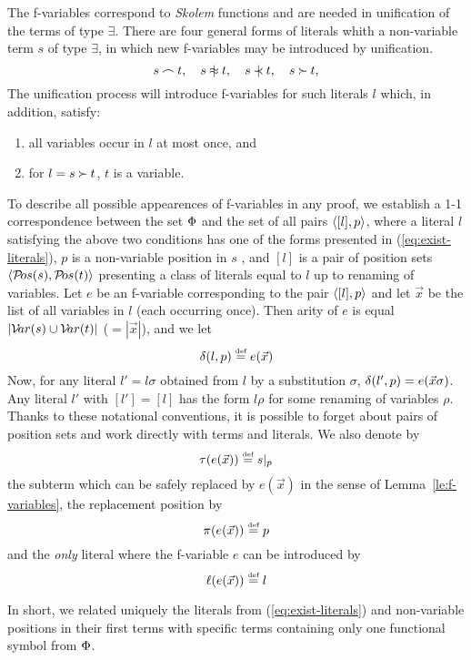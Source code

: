 The f-variables correspond to {\em Skolem} functions and are needed in
unification of the terms of type $\exists$. 
 There are four general forms of literals whith a non-variable 
term $s$ of type $\exists$, 
in which new f-variables may be introduced by unification.
\begin{equation} \label{eq:exist-literals}
 s\Int t,\quad s\notEq t, \quad s\notIncl t, \quad  s\Cont t,
\end{equation} 
The unification process will introduce  f-variables for
such literals $l$ which, in addition, satisfy:
\begin{enumerate}\smallerspaces
\item all variables occur in $l$ at most once, and
\item for $l= s\mathbin{\succ} t$, $t$ is a variable.
\end{enumerate}
To describe all possible appearences of f-variables in any proof, we establish
a 1-1 correspondence  between the set $\Phi$ and the set of all
pairs \(\langle[l],p\rangle\), where a literal $l$ satisfying the above two conditions
has one of the forms presented in
(\ref {eq:exist-literals}), $p$ is a non-variable position in $s$ , and
\([l]\) is a pair of position sets \(\langle{\sl{\cal P}\!os}(s) ,{\sl{\cal P}\!os}(t)\rangle\) presenting a class
of literals equal to $l$ up to renaming of variables.  Let $e$ be an
f-variable corresponding to the pair \(\langle[l],p\rangle\) and let
$\vec x$ be the list of all variables in $l$ (each occurring once).  Then
arity of $e$ is equal \(|{\sl{\cal V}\!ar}(s)\cup{\sl{\cal V}\!ar}(t)|\) (\(=|\vec x|\)), and we let
\[\delta(l,p)\mathrel {\stackrel {\mbox {\tiny def}}{=}} e(\vec x)\] 
Now, for any literal $l'=l\sigma$ obtained from
$l$ by a substitution $\sigma$, \(\delta(l',p)=e(\vec x\sigma)\).  Any literal
$l'$ with \([l']=[l]\) has the form \(l\rho\) for some renaming of
variables $\rho$.  Thanks to these notational conventions,
 it is possible to forget about
pairs of position sets and work directly with terms and literals.  We also
denote by
\[\tau(e(\vec x))\mathrel {\stackrel {\mbox {\tiny def}}{=}} s|_{p}\] 
the subterm which can be safely
replaced by $e(\vec x)$ in the sense of Lemma~\ref {le:f-variables}, 
the replacement position by
\[\pi(e(\vec x))\mathrel {\stackrel {\mbox {\tiny def}}{=}} p\]
and the {\em only} literal
where the f-variable $e$ can be introduced by
\[\ell(e(\vec x))\mathrel {\stackrel {\mbox {\tiny def}}{=}} l\] 

In short, we related uniquely the literals from (\ref{eq:exist-literals}) 
and non-variable positions in their first terms with
specific terms containing only one functional symbol from \( \Phi\).

